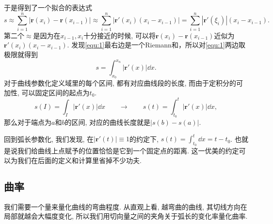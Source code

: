 \documentclass[./main.tex]{subfiles}
\begin{document}
\begin{figure}[!ht]
    \centering
\end{figure}
于是得到了一个拟合的表达式
\begin{equation}\label{equ:1}
    s\approx\sum_{i=1}^n |\mathbf{r}(x_i)-\mathbf{r}(x_{i-1})|\approx\sum_{i=1}^n |\mathbf{r}'(x_i)(x_i-x_{i-1})|=\sum_{i=1}^n |\mathbf{r}'(\xi_i)|(x_i-x_{i-1}).
\end{equation}
第二个\(\approx\)是因为在\(x_{i-1},x_i\)十分接近的时候, 可以将\(\mathbf{r}(x_i)-\mathbf{r}(x_{i-1})\)近似为\(\mathbf{r}'(x_i)(x_i-x_{i-1})\). 发现\eqref{equ:1}最右边是一个Riemann和，所以对\eqref{equ:1}两边取极限就得到
\begin{equation}\label{equ:2}
    s=\int_{x_0}^{x_n}|\mathbf{r}'(x)|\dd x.
\end{equation}
对于曲线参数化定义域里的每个区间, 都有对应曲线段的长度, 而由于定积分的可加性, 可以固定区间的起点为\(t_0\).
\[
    s(I)=\int_I|\mathbf{r}'(x)|\dd x\qquad\longrightarrow\qquad s(t)=\int_{t_0}^t|\mathbf{r}'(x)|\dd x,
\]
那么对于端点为\(a\)和\(b\)的区间, 对应的曲线长度就是\(|s(b)-s(a)|\).

回到弧长参数化, 我们发现, 在\(|\mathbf{r}'(t)|\equiv1\)的约定下, \(s(t)=\int_{t_0}^t\dd x=t-t_0\). 也就是说我们给曲线上点赋予的位置恰恰是它到一个固定点的距离. 这一优美的约定可以为我们在后面的定义和计算里省掉不少功夫.
\subsection{曲率}
我们需要一个量来量化曲线的弯曲程度. 从直观上看, 越弯曲的曲线, 其切线方向在局部就越会大幅度变化, 所以我们用切向量之间的夹角关于弧长的变化率量化曲率.
\end{document}
